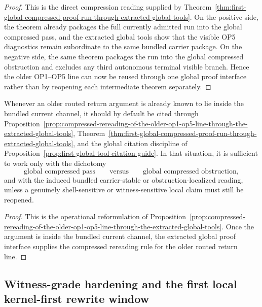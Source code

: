 \begin{proof}
This is the direct compression reading supplied by Theorem~\ref{thm:first-global-compressed-proof-run-through-extracted-global-tools}. On the positive side, the theorem already packages the full currently admitted run into the global compressed pass, and the extracted global tools show that the visible OP5 diagnostics remain subordinate to the same bundled carrier package. On the negative side, the same theorem packages the run into the global compressed obstruction and excludes any third autonomous terminal visible branch. Hence the older OP1--OP5 line can now be reused through one global proof interface rather than by reopening each intermediate theorem separately.
\end{proof}

\begin{corollary}
\label{cor:global-compressed-reading-of-older-routed-return-arguments}
Whenever an older routed return argument is already known to lie inside the bundled current channel, it should by default be cited through Proposition~\ref{prop:compressed-rereading-of-the-older-op1-op5-line-through-the-extracted-global-tools}, Theorem~\ref{thm:first-global-compressed-proof-run-through-extracted-global-tools}, and the global citation discipline of Proposition~\ref{prop:first-global-tool-citation-guide}. In that situation, it is sufficient to work only with the dichotomy
\[
\text{global compressed pass}
\qquad\text{versus}\qquad
\text{global compressed obstruction},
\]
and with the induced bundled carrier-stable or obstruction-localized reading, unless a genuinely shell-sensitive or witness-sensitive local claim must still be reopened.
\end{corollary}

\begin{proof}
This is the operational reformulation of Proposition~\ref{prop:compressed-rereading-of-the-older-op1-op5-line-through-the-extracted-global-tools}. Once the argument is inside the bundled current channel, the extracted global proof interface supplies the compressed rereading rule for the older routed return line.
\end{proof}


\subsection{Witness-grade hardening and the first local kernel-first rewrite window}
\label{sec:witness-grade-hardening-and-first-local-kernel-first-rewrite-window}

